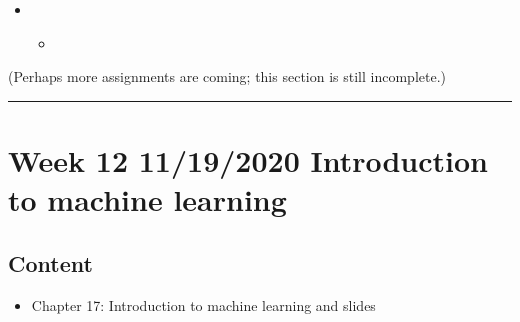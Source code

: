 \documentclass[letterpaper,10pt,english]{sphinxmanual}
\begin{document}
\begin{itemize}
\begin{itemize}
\item {} 
The debt\sphinxhyphen{}to\sphinxhyphen{}income ratio column is categorical instead of numeric.  Make it numeric by replacing each category with a central value in that category.  For instance, the category “20\%\sphinxhyphen{}<30\%” can be replaced with the number 25, the category “43” can be just the number 43, etc.  Let’s use 70 for “>60\%.”

\item {} 
Your newly cleaned data should have all numeric columns.  Export it as a CSV file and bring it with you to class for an in\sphinxhyphen{}class activity in Week 12.

\item {} 
To receive credit for having done this preparatory homework, also email the file to your instructor before class on Week 12.

\end{itemize}

\item {} 
\begin{itemize}
\item {} 
{\hyperref[\detokenize{chapter-17-machine-learning::doc}]{}}

\end{itemize}

\end{itemize}

(Perhaps more assignments are coming; this section is still incomplete.)


\bigskip\hrule\bigskip



\section{Week 12 \sphinxhyphen{} 11/19/2020 \sphinxhyphen{} Introduction to machine learning}
\label{\detokenize{course-schedule:week-12-11-19-2020-introduction-to-machine-learning}}

\subsection{Content}
\label{\detokenize{course-schedule:id21}}\begin{itemize}
\item {} 
Chapter 17: Introduction to machine learning \sphinxhyphen{} {\hyperref[\detokenize{chapter-17-machine-learning::doc}]{}} and slides

\end{itemize}
\end{document}
